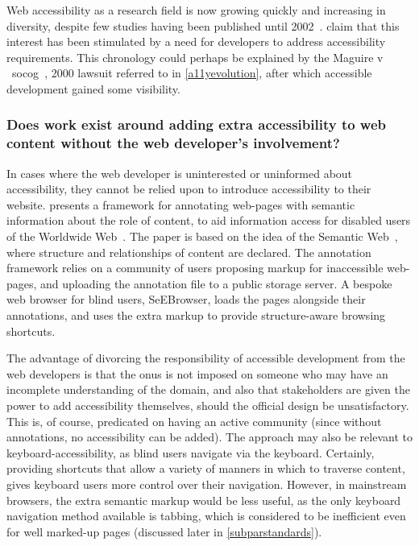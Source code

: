 \documentclass[a4paper, 11pt]{article}
\begin{document}
Web accessibility as a research field is now growing quickly and increasing in diversity, despite few studies having been published until 2002~\cite{freire2007techniques}. \citeauthor{freire2007techniques} claim that this interest has been stimulated by a need for developers to address accessibility requirements. This chronology could perhaps be explained by the Maguire v ~\gls{socog}~\cite{sloan2001web,russell2003access}, 2000 lawsuit referred to in \cref{a11yevolution}, after which accessible development gained some visibility.
\subsubsection{Does work exist around adding extra accessibility to web content without the web developer's involvement?}
\label{addingaccessibilityyourself}
In cases where the web developer is uninterested or uninformed about accessibility, they cannot be relied upon to introduce accessibility to their website. \citeauthor{kouroupetroglou2006semantic} presents a framework for annotating web-pages with semantic information about the role of content, to aid information access for disabled users of the Worldwide Web~\cite{kouroupetroglou2006semantic}. The paper is based on the idea of the Semantic Web~\cite{berners2001semantic}, where structure and relationships of content are declared. The annotation framework relies on a community of users proposing markup for inaccessible web-pages, and uploading the annotation file to a public storage server. A bespoke web browser for blind users, SeEBrowser, loads the pages alongside their annotations, and uses the extra markup to provide structure-aware browsing shortcuts.

The advantage of divorcing the responsibility of accessible development from the web developers is that the onus is not imposed on someone who may have an incomplete understanding of the domain, and also that stakeholders are given the power to add accessibility themselves, should the official design be unsatisfactory. This is, of course, predicated on having an active community (since without annotations, no accessibility can be added). The approach may also be relevant to keyboard-accessibility, as blind users navigate via the keyboard. Certainly, providing shortcuts that allow a variety of manners in which to traverse content, gives keyboard users more control over their navigation. However, in mainstream browsers, the extra semantic markup would be less useful, as the only keyboard navigation method available is tabbing, which is considered to be inefficient even for well marked-up pages (discussed later in \cref{subparstandards}).
\end{document}
